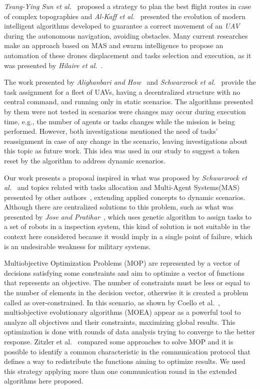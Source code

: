\textit{Tsung-Ying Sun et al.}~\citep{UAV11} proposed a strategy to plan the best flight routes in case of complex topographies and \textit{Al-Kaff et al.}~\citep{UAV10} presented the evolution of modern intelligent algorithms developed to guarantee a correct movement of an \textit{UAV} during the autonomous navigation, avoiding obstacles. Many current researches make an approach based on MAS and swarm intelligence to propose an automation of these drones displacement and tasks selection and execution, as it was presented by \textit{Hilaire et al.}~\citep{UAV12}.

The work presented by \textit{Alighanbari and How}~\citep{alighanbari2005decentralized} and \textit{Schwarzrock et al.}~\citep{MAS07} provide the task assignment for a fleet of UAVs, having a decentralized structure with no central command, and running only in static scenarios. The algorithms presented by them were not tested in scenarios were changes may occur during  execution time, e.g., the number of agents or tasks changes while the mission is being performed. However, both investigations mentioned the need of tasks' reassignment in case of any  change in the scenario, leaving investigations about this topic as future work. This idea was used in our study to suggest a token reset by the algorithm to address dynamic scenarios.

Our work presents a proposal inspired in what was proposed by \textit{Schwarzrock et al.}~\citep{MAS07} and topics related with tasks allocation and Multi-Agent Systems(MAS) presented by other authors~\citep{MAS01, MAS02, MAS03, MAS04, MAS05, MAS06}, extending applied concepts to dynamic scenarios. Although there are centralized solutions to this problem, such as what was presented by \textit{Jose and Pratihar}~\citep{jose2016task}, which uses genetic algorithm to assign tasks to a set of robots in a inspection system, this kind of solution is not suitable in the context here considered because it would imply in a single point of failure, which is an undesirable weakness for military systems.

Multiobjective Optimization Problems (MOP) are represented by a vector of decisions satisfying some constraints and aim to optimize a vector of functions that represents an objective. The number of constraints must be less or equal to the number of elements in the decision vector, otherwise it is created a problem called as over-constrained. In this scenario, as shown by Coello et al.~\citep{MOEA01},  multiobjective evolutionary algorithms (MOEA) appear as a powerful tool to analyze all objectives and their constraints, maximizing global results. This optimization is done with rounds of data analysis trying to converge to the better response. Zitzler et al.~\citep{07} compared some approaches to solve MOP and it is possible to identify a common characteristic in the communication protocol that defines a way to redistribute the functions aiming to optimize results. We used this strategy applying more than one communication round in the extended algorithms here proposed.

